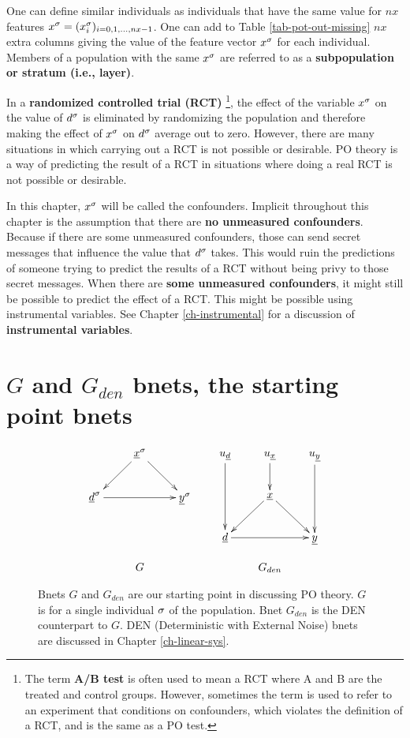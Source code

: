 One can define
similar
individuals as 
individuals that have the same
value
for $nx$ features $x^\sigma=(x^\sigma_i)_{i=0, 1, \ldots, nx-1}$.
One
can add to Table \ref{tab-pot-out-missing}
 $nx$ extra columns
giving the value of
the feature vector $x^\sigma$
for each individual.
Members
of a population with
the same $x^\sigma$ 
are referred to as 
a
{\bf subpopulation or stratum (i.e., layer)}.

In a {\bf randomized controlled trial (RCT)}
\footnote{The term {\bf A/B test}
is often used to mean a RCT
where A and B are the treated and control groups. However,
sometimes the term is used to refer to 
an experiment  that conditions on confounders,
which violates the definition of a RCT,
and is the same as a PO test.},
the effect 
of the variable $x^\sigma$ on 
the value
of $d^\sigma$
is eliminated by
randomizing
the population
and therefore
making the effect of $x^\sigma$
on $d^\sigma$
average out  to zero.
However,
there are many situations
in which carrying out a RCT is not
possible
or desirable. PO theory is
a way of predicting the
result
of a RCT in situations where
doing a real RCT is not possible
or desirable.

In this chapter, $x^\sigma$
will be called the confounders.
Implicit throughout this chapter
is the assumption that there are {\bf 
no unmeasured confounders}.
Because if 
there are some unmeasured confounders,
those can
send secret messages 
that influence the value 
that $d^\sigma$ takes.
This would ruin
the
predictions
of someone trying
to predict the results of a RCT
without
being privy to those secret 
messages.
When there are {\bf some
unmeasured confounders},
it might still be
possible
to
predict the effect of a RCT.
This might be possible
using instrumental variables. See Chapter
\ref{ch-instrumental}
for a discussion
of {\bf instrumental
variables}.


\section{$G$ and $G_{den}$
bnets,
the starting point bnets}


\begin{figure}[h!]
$$
\begin{array}{ccc}
\xymatrix{
&\rvx^\s\ar[dl]\ar[dr]
\\
\rvd^\s\ar[rr]&&\rvy^\s
}
&&
\xymatrix{
u_\rvd\ar[dd]&u_\rvx\ar[d]&u_\rvy\ar[dd]
\\
&\rvx\ar[dl]\ar[dr]
\\
\rvd\ar[rr]&&\rvy
}
\\
\\
G&&G_{den}
\end{array}
$$
\caption{Bnets
$G$ and $G_{den}$
are 
our starting
point in discussing PO theory. 
 $G$ is for 
a single individual $\sigma$ of the 
population.
Bnet $G_{den}$ is the 
DEN counterpart 
to $G$.
DEN (Deterministic with
External Noise) bnets are discussed in Chapter
\ref{ch-linear-sys}.} 
\label{fig-po-G-start}
\end{figure}

